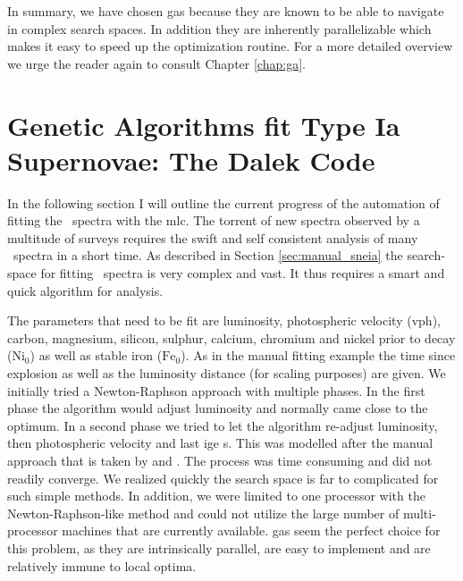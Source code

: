 In summary, we have chosen \glspl{ga} because they are known to be able to navigate in complex search spaces. In addition they are inherently parallelizable which makes it easy to speed up the optimization routine. For a more detailed overview we urge the reader again to consult Chapter \ref{chap:ga}.





\section{Genetic Algorithms fit Type Ia Supernovae: The Dalek Code}
\label{sec:dalek}

In the following section I will outline the current progress of the automation of fitting the \sneia\ spectra with the \gls{mlc}. The torrent of new spectra observed by a multitude of surveys requires the swift and self consistent analysis of many \sneia\ spectra in a short time. As described in Section \ref{sec:manual_sneia} the search-space for fitting \sneia\ spectra is very complex and vast. It thus requires a smart and quick algorithm for analysis.

The parameters that need to be fit are luminosity, photospheric velocity (\gls{vph}), carbon, magnesium, silicon, sulphur, calcium, chromium and nickel prior to decay ($\textrm{Ni}_0$) as well as stable iron ($\textrm{Fe}_0$). As in the manual fitting example the time since explosion as well as the luminosity distance (for scaling purposes) are given. We initially tried a Newton-Raphson approach with multiple phases. In the first phase the algorithm would adjust luminosity and normally came close to the optimum. In a second phase we tried to let the algorithm re-adjust luminosity, then photospheric velocity and last \gls{ige} s. This was modelled after the manual approach that is taken by \citet{hachinger_dipl2007} and \citep{hachinger_phd2011}. The process was time consuming and did not readily converge. We realized quickly the search space is far to complicated for such simple methods. In addition, we were limited to one processor with the Newton-Raphson-like method and could not utilize the large number of multi-processor machines that are currently available. \glspl{ga} seem the perfect choice for this problem, as they are intrinsically parallel, are easy to implement and are relatively immune to local optima.

